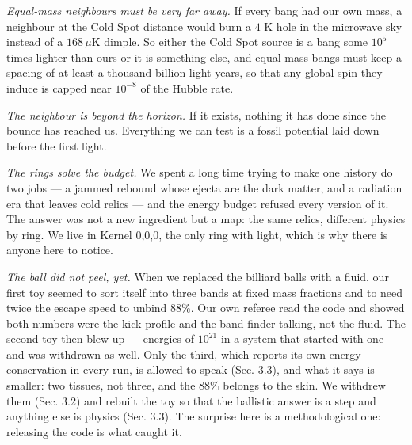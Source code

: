 \documentclass[
  11pt,
]{article}
\begin{document}
\emph{Equal-mass neighbours must be very far away.} If every bang had
our own mass, a neighbour at the Cold Spot distance would burn a \(4\) K
hole in the microwave sky instead of a \(168\,\mu\)K dimple. So either
the Cold Spot source is a bang some \(10^{5}\) times lighter than ours
or it is something else, and equal-mass bangs must keep a spacing of at
least a thousand billion light-years, so that any global spin they
induce is capped near \(10^{-8}\) of the Hubble rate.

\emph{The neighbour is beyond the horizon.} If it exists, nothing it has
done since the bounce has reached us. Everything we can test is a fossil
potential laid down before the first light.

\emph{The rings solve the budget.} We spent a long time trying to make
one history do two jobs --- a jammed rebound whose ejecta are the dark
matter, and a radiation era that leaves cold relics --- and the energy
budget refused every version of it. The answer was not a new ingredient
but a map: the same relics, different physics by ring. We live in Kernel
0,0,0, the only ring with light, which is why there is anyone here to
notice.

\emph{The ball did not peel, yet.} When we replaced the billiard balls
with a fluid, our first toy seemed to sort itself into three bands at
fixed mass fractions and to need twice the escape speed to unbind
\(88\%\). Our own referee read the code and showed both numbers were the
kick profile and the band-finder talking, not the fluid. The second toy
then blew up --- energies of \(10^{21}\) in a system that started with
one --- and was withdrawn as well. Only the third, which reports its own
energy conservation in every run, is allowed to speak (Sec. 3.3), and
what it says is smaller: two tissues, not three, and the \(88\%\)
belongs to the skin. We withdrew them (Sec. 3.2) and rebuilt the toy so
that the ballistic answer is a step and anything else is physics (Sec.
3.3). The surprise here is a methodological one: releasing the code is
what caught it.
\end{document}
